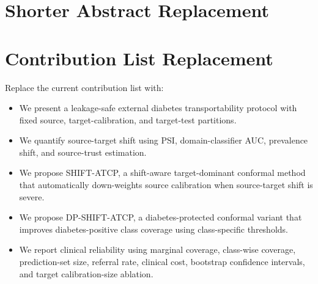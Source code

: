\documentclass[11pt]{article}
\begin{document}
\section{Shorter Abstract Replacement}
\begin{abstract}
Machine learning models for diabetes prediction may perform well in a source dataset but become unreliable when transported to a new clinical population. This study evaluates external diabetes model transportability from the Kaggle Diabetes Prediction Dataset to NHANES 2017--2018 and the Pima Indians Diabetes dataset. Five model families and three feature sets were evaluated under a leakage-safe protocol using fixed source, target-calibration, and target-test splits. To address external dataset shift, we introduce SHIFT-ATCP, a shift-aware conformal framework that estimates source trust using Population Stability Index, domain-classifier AUC, target calibration size, and prevalence shift. We further introduce DP-SHIFT-ATCP, a diabetes-protected variant that improves diabetes-positive class coverage using class-specific conformal thresholds. External shift was severe, with mean PSI values of 1.545 for NHANES and 1.897 for Pima and domain-classifier AUC of 1.000 for both target datasets. Conventional unweighted ATCP undercovered both targets, with mean 90\% coverage of 0.8468 on NHANES and 0.7612 on Pima. Safety-gated SHIFT-ATCP restored near-nominal marginal coverage, reaching 0.9031 on NHANES and 0.9059 on Pima. DP-SHIFT-ATCP improved diabetes-positive coverage from 0.6612 to 0.9090 on NHANES and from 0.8092 to 0.9280 on Pima, with larger prediction sets and referral rates. These results show that reliable external diabetes prediction requires not only discrimination and calibration but also shift-aware conformal uncertainty and class-wise clinical safety analysis.
\end{abstract}

\section{Contribution List Replacement}
Replace the current contribution list with:
\begin{itemize}
    \item We present a leakage-safe external diabetes transportability protocol with fixed source, target-calibration, and target-test partitions.
    \item We quantify source-target shift using PSI, domain-classifier AUC, prevalence shift, and source-trust estimation.
    \item We propose SHIFT-ATCP, a shift-aware target-dominant conformal method that automatically down-weights source calibration when source-target shift is severe.
    \item We propose DP-SHIFT-ATCP, a diabetes-protected conformal variant that improves diabetes-positive class coverage using class-specific thresholds.
    \item We report clinical reliability using marginal coverage, class-wise coverage, prediction-set size, referral rate, clinical cost, bootstrap confidence intervals, and target calibration-size ablation.
\end{itemize}
\end{document}
